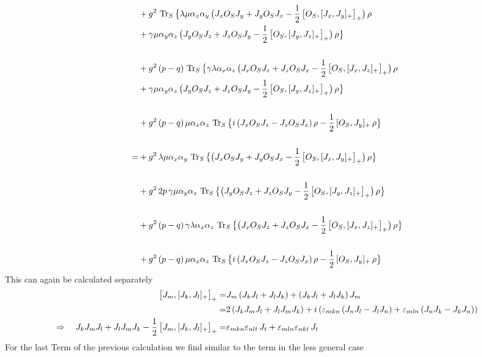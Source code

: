 \documentclass{article}
\begin{document}
\begin{align*}
&+g^2\,\operatorname{Tr}_S\big\{\lambda\mu\alpha_x\alpha_y\,\big(J_x O_S J_y + J_y O_S J_x-\frac{1}{2}\,\big[O_S,[J_x, J_y]_+\big]_+\big)\,\rho \\
    &+\gamma\mu\alpha_y\alpha_z\,\big(J_y O_S J_z + J_z O_S J_y-\frac{1}{2}\,\big[O_S,[J_y,  J_z]_+\big]_+\big)\,\rho\big\}\\\\
    &+g^2\,(p-q)\,\operatorname{Tr}_S\big\{\gamma\lambda\alpha_x\alpha_z\,\big(J_x O_S J_z + J_z O_S J_x-\frac{1}{2}\,\big[O_S,[J_x,  J_z]_+\big]_+\big)\,\rho\\
    &+\gamma\mu\alpha_y\alpha_z\,\big(J_y O_S J_z + J_z O_S J_y-\frac{1}{2}\,\big[O_S,[J_y,  J_z]_+\big]_+\big)\,\rho\big\}\\\\
    &+g^2\,(p-q)\,\mu\alpha_x\alpha_z\,\operatorname{Tr}_S\big\{i\,(J_x O_S J_z-J_z O_S J_x)\,\rho-\frac{1}{2}\,[O_S, J_y]_+\,\rho\big\}\\\\
    =&+g^2\,\lambda\mu\alpha_x\alpha_y\,\operatorname{Tr}_S\big\{\big(J_x O_S J_y + J_y O_S J_x-\frac{1}{2}\,\big[O_S,[J_x, J_y]_+\big]_+\big)\,\rho\big\} \\\\
    &+g^2\,2p\,\gamma\mu\alpha_y\alpha_z\,\operatorname{Tr}_S\big\{\big(J_y O_S J_z + J_z O_S J_y-\frac{1}{2}\,\big[O_S,[J_y,  J_z]_+\big]_+\big)\,\rho\big\}\\\\
    &+g^2\,(p-q)\,\gamma\lambda\alpha_x\alpha_z\,\operatorname{Tr}_S\big\{\big(J_x O_S J_z + J_z O_S J_x-\frac{1}{2}\,\big[O_S,[J_x,  J_z]_+\big]_+\big)\,\rho\big\}\\\\
    &+g^2\,(p-q)\,\mu\alpha_x\alpha_z\,\operatorname{Tr}_S\big\{i\,(J_x O_S J_z-J_z O_S J_x)\,\rho-\frac{1}{2}\,[O_S, J_y]_+\,\rho\big\}
\end{align*}
This can again be calculated separately
\begin{align*}
    \big[J_m,[J_k,J_l]_+\big]_+=&J_m\,(J_kJ_l + J_l J_k)+ (J_kJ_l + J_l J_k)\,J_m\\
    =&2\,(J_k J_m J_l + J_l J_m J_k) +i\,(\varepsilon_{mkn}\,(J_n J_l-J_l J_n) + \varepsilon_{mln}\,(J_n J_k - J_k J_n))\\
    \Rightarrow\quad
    J_k J_m J_l + J_l J_m J_k - \frac{1}{2}\, \big[J_m,[J_k,J_l]_+\big]_+=&\varepsilon_{mkn}\varepsilon_{nlt}\,J_t+\varepsilon_{mln}\varepsilon_{nkt}\,J_t
\end{align*}
For the last Term of the previous calculation we find similar to the term in the less general case
\end{document}
